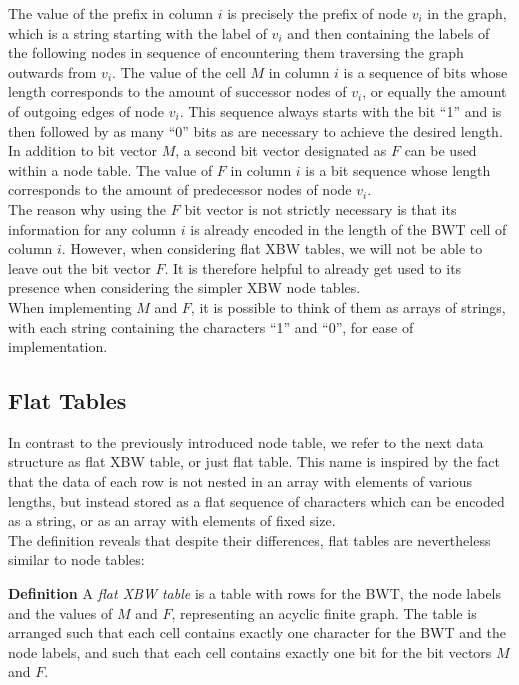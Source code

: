 \documentclass[a4paper,12pt,twoside,BCOR=10mm]{scrbook}
\begin{document}
The value of the prefix in column $ i $ is precisely the prefix of node $ v_i $ in the graph,
which is a string starting with the label of $ v_i $ and then containing
the labels of the following nodes in sequence of encountering them traversing
the graph outwards from $ v_i $.
The value of the cell $ M $ in column $ i $ is a sequence of bits whose length corresponds to
the amount of successor nodes of $ v_i $, or equally the amount of outgoing edges of node $ v_i $.
This sequence always starts with the bit “1” and is then followed
by as many “0” bits as are necessary to achieve the desired length.
In addition to bit vector $ M $, a second bit vector designated as $ F $ can be used within a node table.
The value of $ F $ in column $ i $ is a bit sequence whose length corresponds to
the amount of predecessor nodes of node $ v_i $. \\
The reason why using the $ F $ bit vector is not strictly necessary is that its information
for any column $ i $ is already encoded in the length of the BWT cell of column $ i $. 
However, when considering flat XBW tables, we will not be able to leave out the bit vector $ F $. 
It is therefore helpful to already get used to its presence when considering the simpler XBW node tables. \\
When implementing $ M $ and $ F $, it is possible to think of them as arrays of strings,
with each string containing the characters “1” and “0”, for ease of implementation.

\subsection{Flat Tables}
\label{sec:flat_table_definition}

In contrast to the previously introduced node table,
we refer to the next data structure as flat XBW table, or just flat table.
This name is inspired by the fact that the data of each row is not
nested in an array with elements of various lengths,
but instead stored as a flat sequence of characters which can be encoded as a string,
or as an array with elements of fixed size. \\
The definition reveals that despite their differences,
flat tables are nevertheless similar to node tables:

\textbf{Definition} A \textit{flat XBW table}\label{def:flat_table} is a table with rows for the BWT,
the node labels and the values of $ M $ and $ F $,
representing an acyclic finite graph.
The table is arranged such that each cell contains exactly one character
for the BWT and the node labels, and such that each cell contains exactly
one bit for the bit vectors $ M $ and $ F $.
\end{document}
